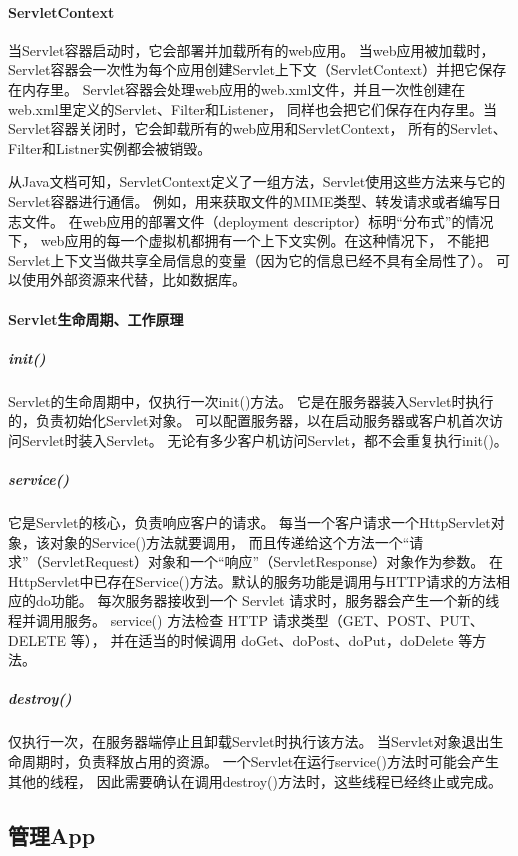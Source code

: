\documentclass{book}
\begin{document}
\paragraph{ServletContext}

当Servlet容器启动时，它会部署并加载所有的web应用。
当web应用被加载时，Servlet容器会一次性为每个应用创建Servlet上下文（ServletContext）并把它保存在内存里。
Servlet容器会处理web应用的web.xml文件，并且一次性创建在web.xml里定义的Servlet、Filter和Listener，
同样也会把它们保存在内存里。当Servlet容器关闭时，它会卸载所有的web应用和ServletContext，
所有的Servlet、Filter和Listner实例都会被销毁。

从Java文档可知，ServletContext定义了一组方法，Servlet使用这些方法来与它的Servlet容器进行通信。
例如，用来获取文件的MIME类型、转发请求或者编写日志文件。
在web应用的部署文件（deployment descriptor）标明“分布式”的情况下，
web应用的每一个虚拟机都拥有一个上下文实例。在这种情况下，
不能把Servlet上下文当做共享全局信息的变量（因为它的信息已经不具有全局性了）。
可以使用外部资源来代替，比如数据库。

\paragraph{Servlet生命周期、工作原理}

\subparagraph{init()}Servlet的生命周期中，仅执行一次init()方法。
它是在服务器装入Servlet时执行的，负责初始化Servlet对象。
可以配置服务器，以在启动服务器或客户机首次访问Servlet时装入Servlet。
无论有多少客户机访问Servlet，都不会重复执行init()。

\subparagraph{service()}它是Servlet的核心，负责响应客户的请求。
每当一个客户请求一个HttpServlet对象，该对象的Service()方法就要调用，
而且传递给这个方法一个“请求”（ServletRequest）对象和一个“响应”（ServletResponse）对象作为参数。
在HttpServlet中已存在Service()方法。默认的服务功能是调用与HTTP请求的方法相应的do功能。
每次服务器接收到一个 Servlet 请求时，服务器会产生一个新的线程并调用服务。
service() 方法检查 HTTP 请求类型（GET、POST、PUT、DELETE 等），
并在适当的时候调用 doGet、doPost、doPut，doDelete 等方法。

\subparagraph{destroy()}仅执行一次，在服务器端停止且卸载Servlet时执行该方法。
当Servlet对象退出生命周期时，负责释放占用的资源。
一个Servlet在运行service()方法时可能会产生其他的线程，
因此需要确认在调用destroy()方法时，这些线程已经终止或完成。

\subsection{管理App}
\end{document}
